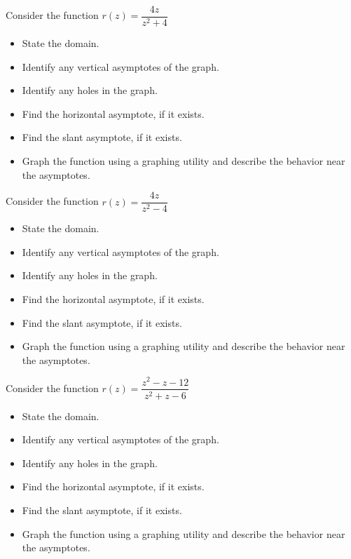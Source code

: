 \documentclass{ximera}
\begin{document}
\begin{problem}
Consider the function $r(z) = \dfrac{4z}{z^2+4}$
\begin{itemize}
\item State the domain.
\item Identify any vertical asymptotes of the graph.
\item Identify any holes in the graph.
\item Find the horizontal asymptote, if it exists.
\item Find the slant asymptote, if it exists.
\item Graph the function using a graphing utility and describe the behavior near the asymptotes.
\end{itemize}
\end{problem}  

\begin{problem}
Consider the function $r(z) = \dfrac{4z}{z^2-4}$
\begin{itemize}
\item State the domain.
\item Identify any vertical asymptotes of the graph.
\item Identify any holes in the graph.
\item Find the horizontal asymptote, if it exists.
\item Find the slant asymptote, if it exists.
\item Graph the function using a graphing utility and describe the behavior near the asymptotes.
\end{itemize}
\end{problem}

\begin{problem}
Consider the function $r(z) = \dfrac{z^2-z-12}{z^2+z-6}$
\begin{itemize}
\item State the domain.
\item Identify any vertical asymptotes of the graph.
\item Identify any holes in the graph.
\item Find the horizontal asymptote, if it exists.
\item Find the slant asymptote, if it exists.
\item Graph the function using a graphing utility and describe the behavior near the asymptotes.
\end{itemize}
\end{problem} 
\end{document}
